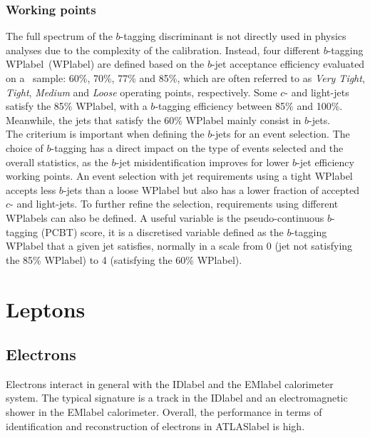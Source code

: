 \subsubsection{Working points}

The full spectrum of the $b$-tagging discriminant is not directly used in physics analyses due to the complexity of the calibration. Instead, four different $b$-tagging \acrlong{WPlabel}~(\acrshort{WPlabel}) are defined based on the $b$-jet acceptance efficiency evaluated on a \ttbar\ sample: 60\%, 70\%, 77\% and 85\%, which are often referred to as \textit{Very Tight}, \textit{Tight}, \textit{Medium} and \textit{Loose} operating points, respectively. Some $c$- and light-jets satisfy the 85\% \acrshort{WPlabel}, with a $b$-tagging efficiency between 85\% and 100\%. Meanwhile, the jets that satisfy the 60\% \acrshort{WPlabel} mainly consist in $b$-jets.\\

The criterium is important when defining the $b$-jets for an event selection. The choice of $b$-tagging has a direct impact on the type of events selected and the overall statistics, as the $b$-jet misidentification improves for lower $b$-jet efficiency working points. An event selection with jet requirements using a tight \acrshort{WPlabel} accepts less $b$-jets than a loose \acrshort{WPlabel} but also has a lower fraction of accepted $c$- and light-jets. To further refine the selection, requirements using different \acrshort{WPlabel}s can also be defined. A useful variable is the pseudo-continuous $b$-tagging (PCBT) score, it is a discretised variable defined as the $b$-tagging \acrshort{WPlabel} that a given jet satisfies, normally in a scale from 0 (jet not satisfying the 85\% \acrshort{WPlabel}) to 4 (satisfying the 60\% \acrshort{WPlabel}).

\clearpage
\section{Leptons}

\subsection{Electrons}

Electrons interact in general with the \acrshort{IDlabel} and the \acrshort{EMlabel} calorimeter system. The typical signature is a track in the \acrshort{IDlabel} and an electromagnetic shower in the \acrshort{EMlabel} calorimeter. Overall, the performance in terms of identification and reconstruction of electrons in \acrshort{ATLASlabel} is high.\\

